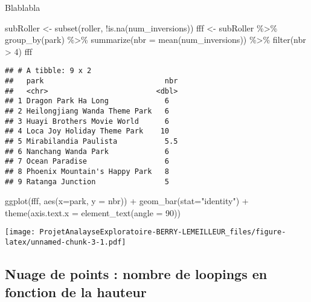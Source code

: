 \documentclass[
]{article}
\newenvironment{Shaded}{\begin{snugshade}}{\end{snugshade}}
\newcommand{\AttributeTok}[1]{\textcolor[rgb]{0.77,0.63,0.00}{#1}}
\newcommand{\DecValTok}[1]{\textcolor[rgb]{0.00,0.00,0.81}{#1}}
\newcommand{\FunctionTok}[1]{\textcolor[rgb]{0.00,0.00,0.00}{#1}}
\newcommand{\NormalTok}[1]{#1}
\newcommand{\OtherTok}[1]{\textcolor[rgb]{0.56,0.35,0.01}{#1}}
\newcommand{\SpecialCharTok}[1]{\textcolor[rgb]{0.00,0.00,0.00}{#1}}
\newcommand{\StringTok}[1]{\textcolor[rgb]{0.31,0.60,0.02}{#1}}
\begin{document}
Blablabla

\begin{Shaded}
\begin{Highlighting}[]
\NormalTok{subRoller }\OtherTok{\textless{}{-}} \FunctionTok{subset}\NormalTok{(roller, }\SpecialCharTok{!}\FunctionTok{is.na}\NormalTok{(num\_inversions))}
\NormalTok{fff }\OtherTok{\textless{}{-}}\NormalTok{ subRoller }\SpecialCharTok{\%\textgreater{}\%} \FunctionTok{group\_by}\NormalTok{(park) }\SpecialCharTok{\%\textgreater{}\%}
  \FunctionTok{summarize}\NormalTok{(}\AttributeTok{nbr =} \FunctionTok{mean}\NormalTok{(num\_inversions)) }\SpecialCharTok{\%\textgreater{}\%}
  \FunctionTok{filter}\NormalTok{(nbr }\SpecialCharTok{\textgreater{}} \DecValTok{4}\NormalTok{)}
\NormalTok{fff }
\end{Highlighting}
\end{Shaded}

\begin{verbatim}
## # A tibble: 9 x 2
##   park                            nbr
##   <chr>                         <dbl>
## 1 Dragon Park Ha Long             6  
## 2 Heilongjiang Wanda Theme Park   6  
## 3 Huayi Brothers Movie World      6  
## 4 Loca Joy Holiday Theme Park    10  
## 5 Mirabilandia Paulista           5.5
## 6 Nanchang Wanda Park             6  
## 7 Ocean Paradise                  6  
## 8 Phoenix Mountain's Happy Park   8  
## 9 Ratanga Junction                5
\end{verbatim}

\begin{Shaded}
\begin{Highlighting}[]
\FunctionTok{ggplot}\NormalTok{(fff, }\FunctionTok{aes}\NormalTok{(}\AttributeTok{x=}\NormalTok{park, }\AttributeTok{y =}\NormalTok{ nbr)) }\SpecialCharTok{+} \FunctionTok{geom\_bar}\NormalTok{(}\AttributeTok{stat=}\StringTok{"identity"}\NormalTok{) }\SpecialCharTok{+} \FunctionTok{theme}\NormalTok{(}\AttributeTok{axis.text.x =} \FunctionTok{element\_text}\NormalTok{(}\AttributeTok{angle =} \DecValTok{90}\NormalTok{))}
\end{Highlighting}
\end{Shaded}

\texttt{[image: ProjetAnalayseExploratoire-BERRY-LEMEILLEUR\_files/figure-latex/unnamed-chunk-3-1.pdf]}

\hypertarget{nuage-de-points-nombre-de-loopings-en-fonction-de-la-hauteur}{%
\subsection{Nuage de points : nombre de loopings en fonction de la
hauteur}\label{nuage-de-points-nombre-de-loopings-en-fonction-de-la-hauteur}}
\end{document}
